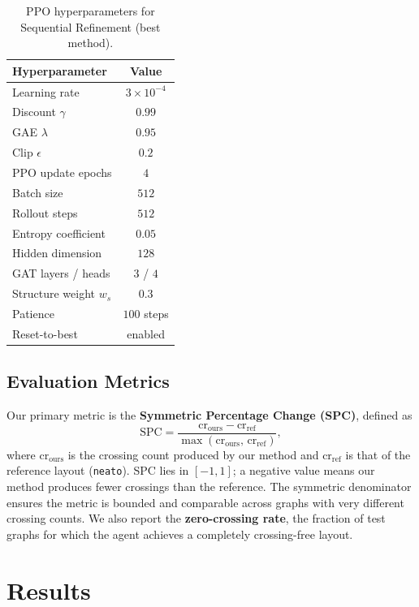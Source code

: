 \documentclass[10pt,twocolumn]{article}
\begin{document}
\begin{table}[h]
\centering
\caption{PPO hyperparameters for Sequential Refinement (best method).}
\label{tab:hparams}
\small
\begin{tabular}{lc}
\toprule
Hyperparameter & Value \\
\midrule
Learning rate & $3\times10^{-4}$ \\
Discount $\gamma$ & $0.99$ \\
GAE $\lambda$ & $0.95$ \\
Clip $\epsilon$ & $0.2$ \\
PPO update epochs & $4$ \\
Batch size & $512$ \\
Rollout steps & $512$ \\
Entropy coefficient & $0.05$ \\
Hidden dimension & $128$ \\
GAT layers / heads & $3$ / $4$ \\
Structure weight $w_s$ & $0.3$ \\
Patience & $100$ steps \\
Reset-to-best & enabled \\
\bottomrule
\end{tabular}
\end{table}

\subsection{Evaluation Metrics}

Our primary metric is the \textbf{Symmetric Percentage Change (SPC)},
defined as
\[
  \text{SPC} = \frac{\text{cr}_{\text{ours}} - \text{cr}_{\text{ref}}}
                    {\max(\text{cr}_{\text{ours}},\,\text{cr}_{\text{ref}})},
\]
where $\text{cr}_{\text{ours}}$ is the crossing count produced by our method
and $\text{cr}_{\text{ref}}$ is that of the reference layout (\texttt{neato}).
SPC lies in $[-1, 1]$; a negative value means our method produces fewer
crossings than the reference.  The symmetric denominator ensures the metric
is bounded and comparable across graphs with very different crossing counts.
We also report the \textbf{zero-crossing rate}, the fraction of test graphs
for which the agent achieves a completely crossing-free layout.

\section{Results}
\label{sec:results}
\end{document}
